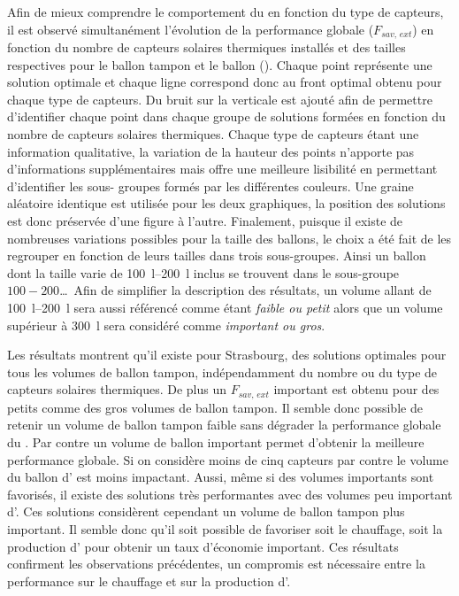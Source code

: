 Afin de mieux comprendre le comportement du  en fonction du type de capteurs, il
est observé simultanément l’évolution de la performance globale ($F_{sav,\, ext}$) en
fonction du nombre de capteurs solaires thermiques installés et des tailles respectives
pour le ballon tampon et le ballon  ().
Chaque point représente une solution optimale et chaque ligne correspond donc au front
optimal obtenu pour chaque type de capteurs. Du bruit sur la verticale est ajouté afin de
permettre d’identifier chaque point dans chaque groupe de solutions formées en fonction du
nombre de capteurs solaires thermiques. Chaque type de capteurs étant une information
qualitative, la variation de la hauteur des points n’apporte pas d’informations
supplémentaires mais offre une meilleure lisibilité en permettant d’identifier les sous-
groupes formés par les différentes couleurs. Une graine aléatoire identique est utilisée
pour les deux graphiques, la position des solutions est donc préservée d’une figure à
l’autre. Finalement, puisque il existe de nombreuses variations possibles pour la taille
des ballons, le choix a été fait de les regrouper en fonction de leurs tailles dans trois
sous-groupes. Ainsi un ballon dont la taille varie de \SIrange{100}{200}{\litre} inclus se
trouvent dans le sous-groupe $100-200$\dots\ Afin de simplifier la description des résultats,
un volume allant de \SIrange{100}{200}{\litre} sera aussi référencé comme étant
\emph{faible ou petit} alors que un volume supérieur à \SI{300}{\litre} sera considéré
comme \emph{important ou gros}.

Les résultats montrent qu’il existe pour Strasbourg, des solutions optimales pour tous les volumes de
ballon tampon, indépendamment du nombre ou du type de capteurs solaires thermiques. De
plus un $F_{sav,\, ext}$ important est obtenu pour des petits comme des gros volumes de
ballon tampon. Il semble donc possible de retenir un volume de ballon tampon faible sans
dégrader la performance globale du . Par contre un volume de ballon 
important permet d’obtenir la meilleure performance globale. Si on considère moins de cinq
capteurs par contre le volume du ballon d’ est moins impactant. Aussi,
même si des volumes importants sont favorisés, il existe des solutions très
performantes avec des volumes peu important d’. Ces solutions considèrent
cependant un volume de ballon tampon plus important. Il semble donc qu’il soit possible de
favoriser soit le chauffage, soit la production d’ pour obtenir un taux
d’économie important. Ces résultats confirment les observations précédentes, un compromis
est nécessaire entre la performance sur le chauffage et sur la production d’.


